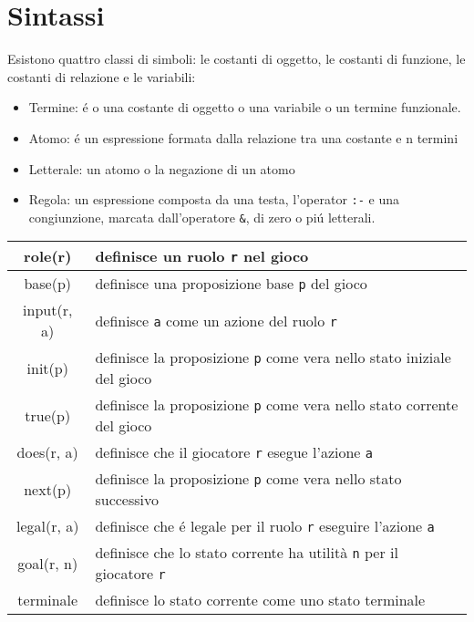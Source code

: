 \section{Sintassi}
Esistono quattro classi di simboli: le costanti di oggetto, 
le costanti di funzione, le costanti di relazione e le variabili: 
\begin{itemize}
    \item Termine: é o una costante di oggetto o una variabile o un termine funzionale.
    \item Atomo: é un espressione formata dalla relazione tra una costante e n termini
    \item Letterale: un atomo o la negazione di un atomo
    \item {
        Regola: un espressione composta da una testa, l'operator \lstinline|:-| e una congiunzione, 
        marcata dall'operatore \lstinline|&|, di zero o piú letterali.
    }
\end{itemize}
\begin{center}
\begin{tabular}{|c|p{10cm}|}
    \hline
    role(r) & definisce un ruolo \lstinline|r| nel gioco \\
    \hline
    base(p) & definisce una proposizione base \lstinline|p| del gioco \\
    \hline
    input(r, a) & definisce \lstinline|a| come un azione del ruolo \lstinline|r| \\
    \hline
    init(p) & definisce la proposizione \lstinline|p| come vera nello stato iniziale del gioco \\ 
    \hline
    true(p) & definisce la proposizione \lstinline|p| come vera nello stato corrente del gioco \\
    \hline
    does(r, a) & definisce che il giocatore \lstinline|r| esegue l'azione \lstinline|a| \\
    \hline
    next(p) & definisce la proposizione \lstinline|p| come vera nello stato successivo \\
    \hline
    legal(r, a) & definisce che é legale per il ruolo \lstinline|r| eseguire l'azione \lstinline|a| \\
    \hline
    goal(r, n) & definisce che lo stato corrente ha utilità \lstinline|n| per il giocatore \lstinline|r| \\
    \hline
    terminale & definisce lo stato corrente come uno stato terminale \\ 
    \hline
\end{tabular}
\end{center}
